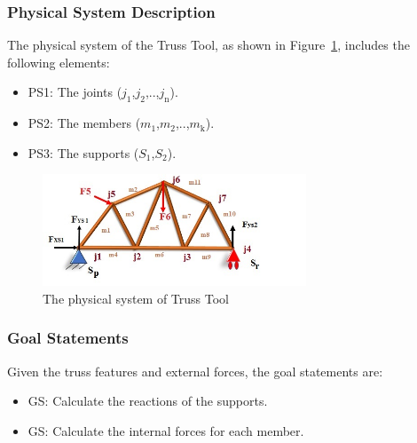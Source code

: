 \documentclass[12pt]{article}
\newcounter{goalnum} %
\begin{document}
\subsubsection{Physical System Description} \label{sec_phySystDescrip}

The physical system of the Truss Tool, as shown in Figure~\ref{fig_physys},
includes the following elements:

\begin{itemize}

\item{PS1: The joints ($j_\text{1}$,$j_\text{2}$,..,$j_\text{n}$).}
\item{PS2: The members ($m_\text{1}$,$m_\text{2}$,..,$m_\text{k}$).}
\item{PS3: The supports ($S_\text{1}$,$S_\text{2}$).}

\end{itemize}

 \begin{figure}[h!]
\begin{center}
 
  \includegraphics[width=0.7\textwidth]{physic_system.jpg}
 
 \caption{The physical system of Truss Tool}
 \label{fig_physys}
 \end{center}
 \end{figure}

\subsubsection{Goal Statements} \label{Sec_gs}

\noindent Given the truss features and external forces, the goal statements are:

\begin{itemize}
\item{GS\thegoalnum \label{G_react}: Calculate the reactions of the supports.}
\item{GS\thegoalnum \label{G_force}: Calculate the internal forces for each member.}
\end{itemize}
\end{document}
